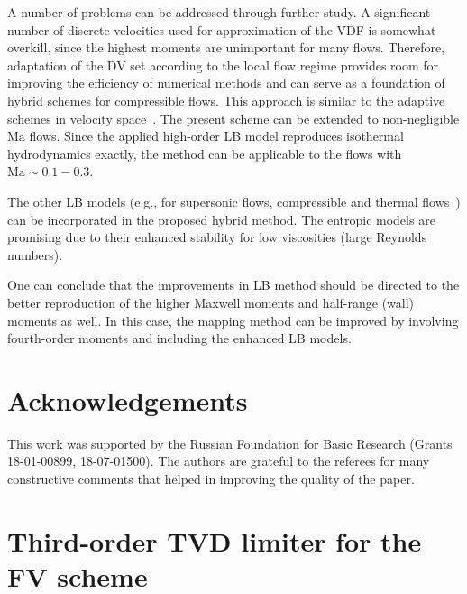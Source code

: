\documentclass{elsarticle} %
\newcommand{\Ma}{\mathrm{Ma}}
\begin{document}
A number of problems can be addressed through further study.
A significant number of discrete velocities used for approximation of the VDF is somewhat overkill,
since the highest moments are unimportant for many flows.
Therefore, adaptation of the DV set according to the local flow regime provides room for improving the efficiency of numerical methods
and can serve as a foundation of hybrid schemes for compressible flows.
This approach is similar to the adaptive schemes in velocity space~\cite{Aristov1977, Kolobov2013, Baranger2014}.
The present scheme can be extended to non-negligible $\Ma$ flows. Since the applied high-order LB model reproduces isothermal hydrodynamics exactly, the method can be applicable to the flows with $\Ma \sim 0.1-0.3$.

The other LB models (e.g., for supersonic flows, compressible and thermal flows~\cite{Chen2010, Frapolli2015, Frapolli2016})
can be incorporated in the proposed hybrid method.
The entropic models are promising due to their enhanced stability for low viscosities (large Reynolds numbers).


One can conclude that the improvements in LB method should be directed
to the better reproduction of the higher Maxwell moments and half-range (wall) moments as well.
In this case, the mapping method can be improved by involving fourth-order moments
and including the enhanced LB models.

\section*{Acknowledgements}

This work was supported by the Russian Foundation for Basic Research (Grants 18-01-00899, 18-07-01500).
The authors are grateful to the referees for many constructive comments that helped in improving the quality of the paper.

\appendix

\section{Third-order TVD limiter for the FV scheme}\label{sec:limiter}
\end{document}
